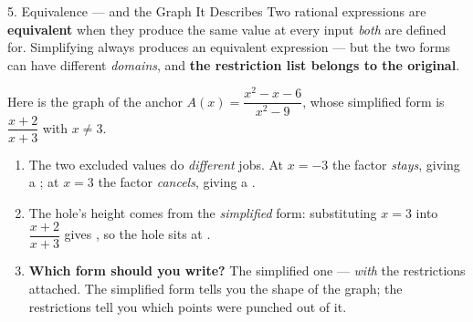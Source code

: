 \documentclass[10pt]{article}
\newcommand{\lgrid}[4]{%
  \draw[step=1, linegray!40, very thin] (#1,#3) grid (#2,#4);
  \draw[->, semithick, charcoal] (#1,0)--(#2,0) node[below right, font=\scriptsize]{$x$};
  \draw[->, semithick, charcoal] (0,#3)--(0,#4) node[left, font=\scriptsize]{$y$};}
\begin{document}
\begin{notesbox}{5. Equivalence --- and the Graph It Describes}
Two rational expressions are \textbf{equivalent} when they produce the same value at every input
\emph{both} are defined for. Simplifying always produces an equivalent expression --- but the two forms
can have different \emph{domains}, and \textbf{the restriction list belongs to the original}.

\vspace{3pt}
Here is the graph of the anchor $A(x)=\dfrac{x^2-x-6}{x^2-9}$, whose simplified form is
$\dfrac{x+2}{x+3}$ with $x\neq3$.
\begin{center}
\end{center}
\begin{enumerate}[leftmargin=1.7em, itemsep=3pt]
  \item The two excluded values do \emph{different} jobs. At $x=-3$ the factor \emph{stays}, giving a
        \blank{4.0cm}; at $x=3$ the factor \emph{cancels}, giving a \blank{1.4cm}.
  \item The hole's height comes from the \emph{simplified} form: substituting $x=3$ into
        $\dfrac{x+2}{x+3}$ gives \blank{1.0cm}, so the hole sits at \blank{1.6cm}.
  \item \textbf{Which form should you write?} The simplified one --- \emph{with} the restrictions
        attached. The simplified form tells you the shape of the graph; the restrictions tell you which
        points were punched out of it.
\end{enumerate}


\end{notesbox}
\end{document}
